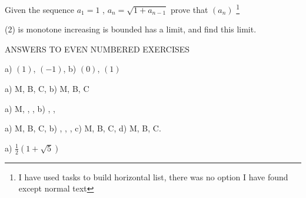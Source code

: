 \documentclass[11pt]{amsbook}
\begin{document}

    \begin{hEnumerateArabic}
        \setcounter{enumi}{9}
        \item Given the sequence  $a_{1}=1$ , $a_{n}= \sqrt{1+a_{n-1}}$ prove that $(a_{n})$ \footnote{I have used tasks to build horizontal list, there was no option I have found except normal text}
    \end{hEnumerateArabic}
    
    \hfill

    \begin{tasks}(2)
        \task is monotone increasing 
        \task is bounded
        \task has a limit, and find this limit.
    \end{tasks}
    
    \vspace{2cm}
    
    \centering ANSWERS TO EVEN NUMBERED EXERCISES
    
    \vspace{4mm}

    \begin{hEnumerateArabic}
        \setcounter{enumi}{1}
        \item a) $(1)$, $(-1)$, \quad b) $(0)$, $(1)$ 
        
        \hfill
        \setcounter{enumi}{3}
        \item a) M, B, C, \quad b) M, B, C 
        
        \hfill
        \setcounter{enumi}{5}
        \item a) M, , , \quad b) , , 
        
        \hfill
        \setcounter{enumi}{7}
        \item a) M, B, C, \quad b) , , , 
        \quad c) M, B, C, \quad d) M, B, C.
        
        \hfill
        \setcounter{enumi}{9}
        \item a) $\frac{1}{2}(1+\sqrt{5})$
    \end{hEnumerateArabic}
\end{document}
